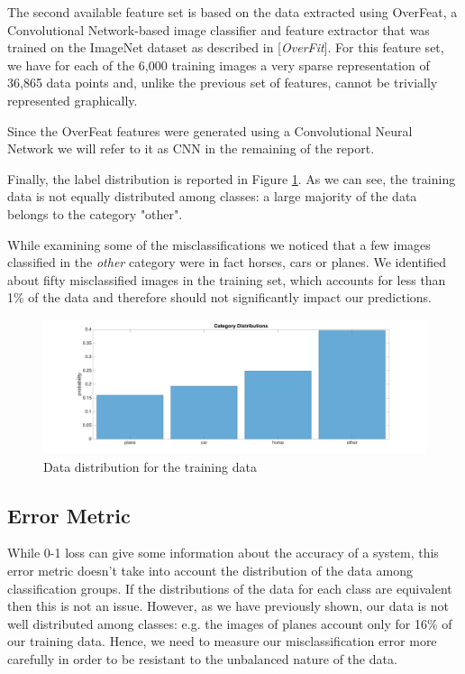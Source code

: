 \documentclass{article} %
\begin{document}
The second available feature set is based on the data extracted using OverFeat, a Convolutional Network-based image classifier and feature extractor that was trained on the ImageNet dataset as described in [\textit{OverFit}].
For this feature set, we have for each of the 6,000 training images a very sparse representation of 36,865 data points and, unlike the previous set of features, cannot be trivially represented graphically.

Since the OverFeat features were generated using a Convolutional Neural Network we will refer to it as CNN in the remaining of the report.

Finally, the label distribution is reported in Figure \ref{fig:data-distribution}. As we can see, the training data is not equally distributed among classes: a large majority of the data belongs to the category "other".

While examining some of the misclassifications we noticed that a few images classified in the \textit{other} category were in fact horses, cars or planes. We identified about fifty misclassified images in the training set, which accounts for less than 1\% of the data and therefore should not significantly impact our predictions.

\begin{figure}[h]
  \center
  \includegraphics[width=\textwidth]{figures/data_distribution}
  \caption{Data distribution for the training data}
  \label{fig:data-distribution}
\end{figure}

\subsection{Error Metric}

While 0-1 loss can give some information about the accuracy of a system, this error metric doesn't take into account the distribution of the data among classification groups. If the distributions of the data for each class are equivalent then this is not an issue. However, as we have previously shown, our data is not well distributed among classes: e.g. the images of planes account only for 16\% of our training data. Hence, we need to measure our misclassification error more carefully in order to be resistant to the unbalanced nature of the data.
\end{document}
